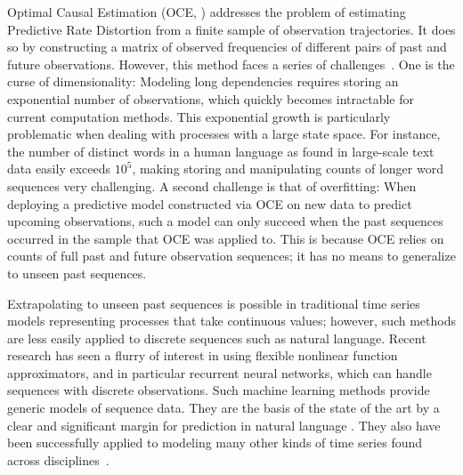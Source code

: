 \documentclass[entropy,article,submit,moreauthors,pdftex,10pt,a4paper]{Definitions/mdpi}
\begin{document}
Optimal Causal Estimation (OCE, \citet{still-optimal-2010}) addresses the problem of estimating Predictive Rate Distortion from a finite sample of observation trajectories.
It does so by constructing a matrix of observed frequencies of different pairs of past and future observations.
However, this method faces a series of challenges~\citep{marzen-predictive-2016}.
One is the curse of dimensionality:
Modeling long dependencies requires storing an exponential number of observations, which quickly becomes intractable for current computation methods.
This exponential growth is particularly problematic when dealing with processes with a large state space.
For instance, the number of distinct words in a human language as found in large-scale text data easily exceeds $10^5$, making storing and manipulating counts of longer word sequences very challenging.
A second challenge is that of overfitting:
When deploying a predictive model constructed via OCE on new data to predict upcoming observations, such a model can only succeed when the past sequences occurred in the sample that OCE was applied to.
This is because OCE relies on counts of full past and future observation sequences; it has no means to generalize to unseen past sequences.

Extrapolating to unseen past sequences is possible in traditional time series models representing processes that take continuous values; however, such methods are less easily applied to discrete sequences such as natural language.
Recent research has seen a flurry of interest in using flexible nonlinear function approximators, and in particular recurrent neural networks, which can handle sequences with discrete observations.
Such machine learning methods provide generic models of sequence data.
They are the basis of the state of the art by a clear and significant margin for prediction in natural language \citep{DBLP:journals/corr/JozefowiczVSSW16, merity2018analysis, dai2019transformer,takahashi2018cross}.
They also have been successfully applied to modeling many other kinds of time series found across disciplines~\citep{ogunmolu2016nonlinear,laptev2017time,meyer2018survey,hundman2018detecting,white2018forecasting,woo2018dynamic,sirignano2018universal,mohajerin2019multistep}. %
\end{document}
